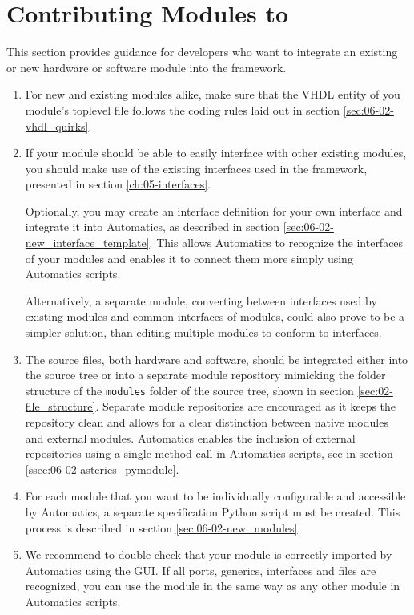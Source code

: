 \section{Contributing Modules to \asterics}

This section provides guidance for developers who want to integrate an existing or new hardware or software module into the \asterics framework.


\begin{enumerate}

\item
For new and existing modules alike, make sure that the VHDL entity of you module's toplevel file follows the coding rules laid out in section \ref{sec:06-02-vhdl_quirks}.

\item
If your module should be able to easily interface with other existing \asterics modules, you should make use of the existing interfaces used in the framework, presented in section \ref{ch:05-interfaces}.

Optionally, you may create an interface definition for your own interface and integrate it into Automatics, as described in section \ref{sec:06-02-new_interface_template}.
This allows Automatics to recognize the interfaces of your modules and enables it to connect them more simply using Automatics scripts.

Alternatively, a separate module, converting between interfaces used by existing modules and common interfaces of \asterics modules, could also prove to be a simpler solution, than editing multiple modules to conform to \asterics interfaces.

\item
The source files, both hardware and software, should be integrated either into the \asterics source tree or into a separate module repository mimicking the folder structure of the \texttt{modules} folder of the \asterics source tree, shown in section \ref{sec:02-file_structure}.
Separate module repositories are encouraged as it keeps the \asterics repository clean and allows for a clear distinction between \asterics native modules and external modules.
Automatics enables the inclusion of external repositories using a single method call in Automatics scripts, see  in section \ref{ssec:06-02-asterics_pymodule}.

\item 
For each module that you want to be individually configurable and accessible by Automatics, a separate specification Python script must be created.
This process is described in section \ref{sec:06-02-new_modules}.

\item
We recommend to double-check that your module is correctly imported by Automatics using the \asterics GUI.
If all ports, generics, interfaces and files are recognized, you can use the module in the same way as any other module in Automatics scripts.

\end{enumerate}





